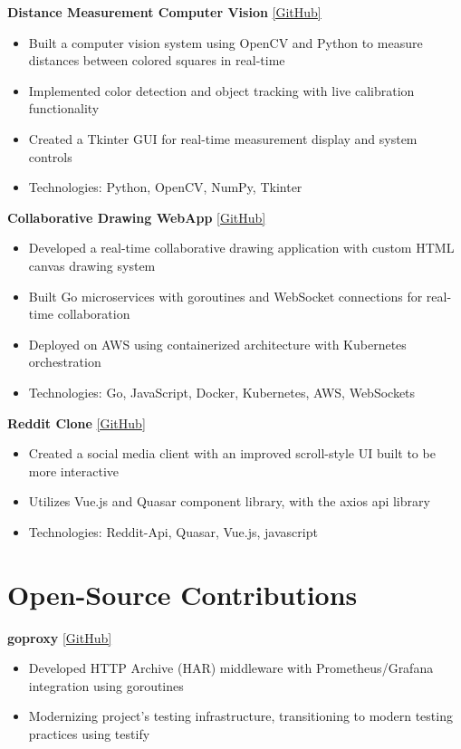 \documentclass[10pt,a4paper]{article}
\begin{document}
	
	\textbf{Distance Measurement Computer Vision} \href{https://github.com/CameronBadman/computer-vision}{[GitHub]}
	\begin{itemize}[label=\textbullet, itemsep=0.05cm]
		\item Built a computer vision system using OpenCV and Python to measure distances between colored squares in real-time
		\item Implemented color detection and object tracking with live calibration functionality
		\item Created a Tkinter GUI for real-time measurement display and system controls
		\item Technologies: Python, OpenCV, NumPy, Tkinter
	\end{itemize}
	
	\textbf{Collaborative Drawing WebApp} \href{https://github.com/CameronBadman/Canvis-collab-webapp}{[GitHub]}
	\begin{itemize}[label=\textbullet, itemsep=0.05cm]
		\item Developed a real-time collaborative drawing application with custom HTML canvas drawing system
		\item Built Go microservices with goroutines and WebSocket connections for real-time collaboration
		\item Deployed on AWS using containerized architecture with Kubernetes orchestration
		\item Technologies: Go, JavaScript, Docker, Kubernetes, AWS, WebSockets
	\end{itemize}
	
	\textbf{Reddit Clone} \href{https://github.com/CameronBadman/Reddit-Clone}{[GitHub]}
	\begin{itemize}[label=\textbullet, itemsep=0.05cm]
		\item Created a social media client with an improved scroll-style UI built to be more interactive
		\item Utilizes Vue.js and Quasar component library, with the axios api library
		\item Technologies: Reddit-Api, Quasar, Vue.js, javascript
	\end{itemize}
	
	\section{Open-Source Contributions}
	\textbf{goproxy} \href{https://github.com/elazarl/goproxy}{[GitHub]}
	\begin{itemize}[label=\textbullet, itemsep=0.02cm]
		\item Developed HTTP Archive (HAR) middleware with Prometheus/Grafana integration using goroutines
		\item Modernizing project's testing infrastructure, transitioning to modern testing practices using testify
	\end{itemize}
	
\end{document}
